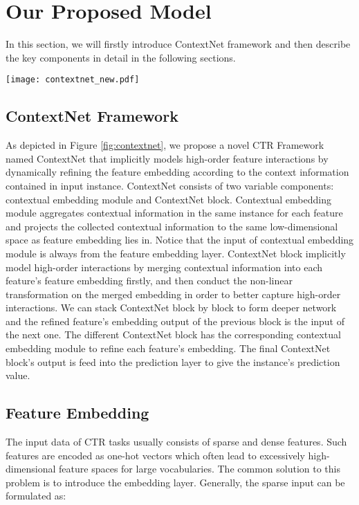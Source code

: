 \documentclass[sigconf]{acmart}
\begin{document}
\section{Our Proposed Model}



In this section, we will firstly introduce ContextNet framework and then describe the key components in detail in the following sections.

\begin{figure*}
  \setlength{\abovecaptionskip}{0pt}
  \centering
  \texttt{[image: contextnet\_new.pdf]}
  \caption{The Neural Structure of ContextNet  Framework}
  \label{fig:contextnet}
\end{figure*}

\subsection{ContextNet Framework}
As depicted in Figure \ref{fig:contextnet},  we propose a novel CTR Framework named ContextNet that implicitly models high-order feature interactions by dynamically refining the feature embedding according to the context information contained in input instance. ContextNet consists of two variable components: contextual embedding module and ContextNet block. Contextual embedding module aggregates contextual information in the same instance for each feature and projects the collected contextual information to the same low-dimensional space as feature embedding lies in. Notice that the input of contextual embedding module is always from the feature embedding layer. ContextNet block implicitly model high-order interactions by merging contextual information into each feature's feature embedding firstly, and then conduct the non-linear transformation on the merged embedding in order to  better capture high-order interactions. We can stack ContextNet  block by block to form deeper network and the refined feature's embedding output of the previous block is the input of the next one. The different ContextNet block has the corresponding contextual embedding module to refine each feature’s embedding. The final ContextNet block’s output is feed into the prediction layer to give the instance's prediction value.





\subsection{Feature Embedding}
The input data of CTR tasks usually consists of sparse and dense features. Such features are  encoded as one-hot vectors which often lead to excessively high-dimensional feature spaces for large vocabularies. The common solution to this problem is to introduce the embedding layer. Generally, the sparse input can be formulated as:
\end{document}

